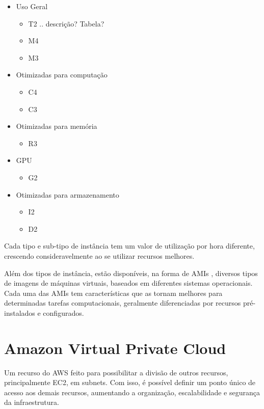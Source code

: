 \documentclass[tg]{mdtufsm}
\begin{document}
\begin{itemize}
\item Uso Geral
	\begin{itemize}
	\item T2 .. descrição? Tabela?
	\item M4
	\item M3
	\end{itemize}
\item Otimizadas para computação
	\begin{itemize}
	\item C4
	\item C3
	\end{itemize}
\item Otimizadas para memória
	\begin{itemize}
	\item R3
	\end{itemize}
\item GPU
	\begin{itemize}
	\item G2
	\end{itemize}
\item Otimizadas para armazenamento
	\begin{itemize}
	\item I2
	\item D2
	\end{itemize}
\end{itemize}

Cada tipo e sub-tipo de instância tem um valor de utilização por hora diferente, crescendo consideravelmente ao se utilizar recursos melhores.

Além dos tipos de instância, estão disponíveis, na forma de AMIs \cite{ami}, diversos tipos de imagens de máquinas virtuais, baseados em diferentes sistemas operacionais. Cada uma das AMIs tem características que as tornam melhores para determinadas tarefas computacionais, geralmente diferenciadas por recursos pré-instalados e configurados.

\section{Amazon Virtual Private Cloud}

Um recurso do AWS feito para possibilitar a divisão de outros recursos, principalmente EC2, em subnets. Com isso, é possível definir um ponto único de acesso aos demais recursos, aumentando a organização, escalabilidade e segurança da infraestrutura.
\end{document}
